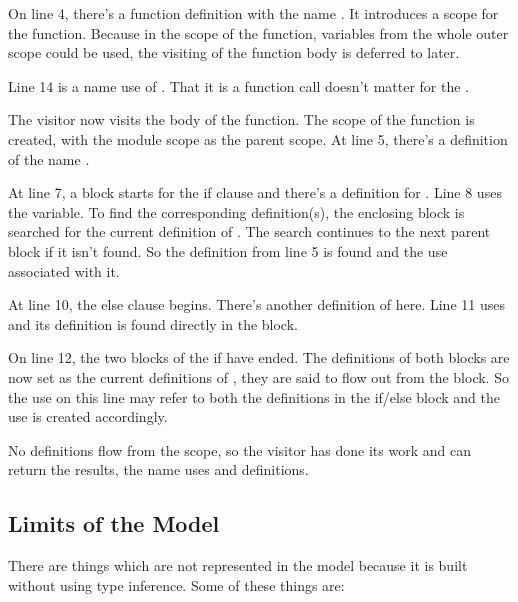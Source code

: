 \documentclass[12pt,halfparskip,DIV11,BCOR10mm]{scrreprt}
\begin{document}
On line 4, there's a function definition with the name . It introduces a scope for the function. Because in the scope of the function, variables from the whole outer scope could be used, the visiting of the function body is deferred to later.

Line 14 is a name use of . That it is a function call doesn't matter for the .

The visitor now visits the body of the function. The scope of the function is created, with the module scope as the parent scope. At line 5, there's a definition of the name .

At line 7, a block starts for the if clause and there's a definition for . Line 8 uses the  variable. To find the corresponding definition(s), the enclosing block is searched for the current definition of . The search continues to the next parent block if it isn't found. So the definition from line 5 is found and the use associated with it.

At line 10, the else clause begins. There's another definition of  here. Line 11 uses  and its definition is found directly in the block.

On line 12, the two blocks of the if have ended. The definitions of both blocks are now set as the current definitions of , they are said to flow out from the block. So the use on this line may refer to both the definitions in the if/else block and the use is created accordingly.

No definitions flow from the scope, so the visitor has done its work and can return the results, the name uses and definitions.



\subsection{Limits of the Model}

There are things which are not represented in the model because it is built without using type inference. Some of these things are:
\end{document}
